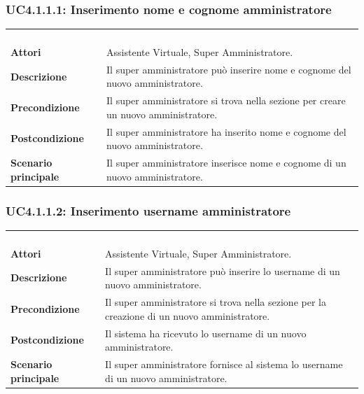\subsubsection{UC4.1.1.1: Inserimento nome e cognome amministratore}
\label{UC4.1.1.1}
\begin{longtable}{l|p{10cm}}
\rowcolor[gray]{0.8} \multicolumn{2}{c}{} \\
\rowcolor[gray]{0.8} \multicolumn{2}{c}{\textbf{UC4.1.1.1 - Inserimento nome e cognome amministratore}} \\
\rowcolor[gray]{0.8} \multicolumn{2}{c}{} \\
\hline
&\\
\textbf{Attori} & Assistente Virtuale, Super Amministratore.\\[7pt]
\textbf{Descrizione} & Il super amministratore può inserire nome e cognome del nuovo amministratore.\\[7pt]
\textbf{Precondizione} & Il super amministratore si trova nella sezione per creare un nuovo amministratore. \\[7pt]
\textbf{Postcondizione} & Il super amministratore ha inserito nome e cognome del nuovo amministratore.\\[7pt]
\textbf{Scenario principale} &Il super amministratore inserisce nome e cognome di un nuovo amministratore.\\[7pt]\hline
\end{longtable}

\subsubsection{UC4.1.1.2: Inserimento username amministratore}
\label{UC4.1.1.2}
\begin{longtable}{l|p{10cm}}
\rowcolor[gray]{0.8} \multicolumn{2}{c}{} \\
\rowcolor[gray]{0.8} \multicolumn{2}{c}{\textbf{UC4.1.1.2 - Inserimento username amministratore}} \\
\rowcolor[gray]{0.8} \multicolumn{2}{c}{} \\
\hline
&\\
\textbf{Attori} & Assistente Virtuale, Super Amministratore.\\[7pt]
\textbf{Descrizione} & Il super amministratore può inserire lo username di un nuovo amministratore.\\[7pt]
\textbf{Precondizione} & Il super amministratore si trova nella sezione per la creazione di un nuovo amministratore.\\[7pt]
\textbf{Postcondizione} & Il sistema ha ricevuto lo username di un nuovo amministratore.\\[7pt]
\textbf{Scenario principale} &Il super amministratore fornisce al sistema lo username di un nuovo amministratore.\\[7pt]\hline
\end{longtable}

